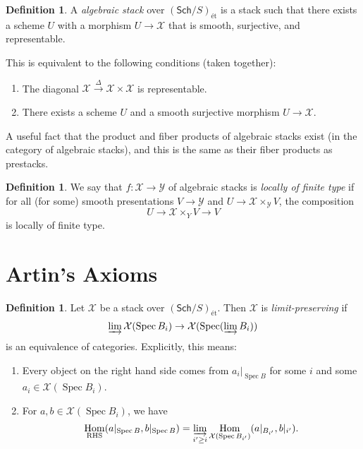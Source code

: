 \documentclass[leqno, openany]{memoir}
\theoremstyle{definition}
\newtheorem{defn}[thm]{Definition}
\theoremstyle{remark}
\theoremstyle{plain}
\theoremstyle{definition}
\theoremstyle{remark}
\newcommand{\mc}[1]{\mathcal{#1}}
\newcommand{\mr}[1]{\mathrm{#1}}
\newcommand{\ms}[1]{\mathsf{#1}}
\DeclareMathOperator{\Hom}{Hom}
\DeclareMathOperator{\Spec}{Spec}
\begin{document}
\begin{defn}
    A \textit{algebraic stack} over $(\ms{Sch}/S)_{\text{\'et}}$ is a stack such that there exists a scheme $U$ with a morphism $U \to \mc{X}$ that is smooth, surjective, and representable.
\end{defn}

This is equivalent to the following conditions (taken together):
\begin{enumerate}
    \item The diagonal $\mc{X} \xrightarrow{\Delta} \mc{X} \times \mc{X}$ is representable.
    \item There exists a scheme $U$ and a smooth surjective morphism $U \to \mc{X}$.
\end{enumerate}

A useful fact that the product and fiber products of algebraic stacks exist (in the category of algebraic stacks), and this is the same as their fiber products as prestacks.

\begin{defn}
    We say that $f \colon \mc{X} \to \mc{Y}$ of algebraic stacks is \textit{locally of finite type} if for all (for some) smooth presentations $V \to \mc{Y}$ and $U \to \mc{X} \times_{\mc{Y}} V$, the composition
    \[ U \to \mc{X} \times_Y V \to V \]
    is locally of finite type.
\end{defn}

\section{Artin's Axioms}%
\label{sec:artin_s_axioms}

\begin{defn}
    Let $\mc{X}$ be a stack over $(\ms{Sch}/S)_{\text{\'et}}$. Then $\mc{X}$ is \textit{limit-preserving} if
    \[ \varinjlim \mc{X}(\Spec B_i) \to \mc{X}(\Spec(\varinjlim B_i)) \]
    is an equivalence of categories. Explicitly, this means:
    \begin{enumerate}
        \item Every object on the right hand side comes from $a_i |_{\Spec B}$ for some $i$ and some $a_i \in \mc{X}(\Spec B_i)$.
        \item For $a, b \in \mc{X}(\Spec B_i)$, we have
            \[ \Hom_{\mr{RHS}}(a|_{\Spec B}, b|_{\Spec B}) = \varinjlim_{i' \geq i} \Hom_{\mc{X}(\Spec B_{i'})} (a|_{B_{i'}}, b|_{i'}). \]
    \end{enumerate}
\end{defn}
\end{document}
